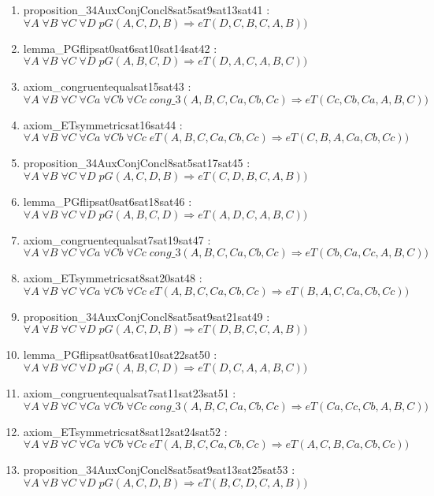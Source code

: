 \documentclass{article}
\begin{document}
\begin{enumerate}
\item proposition\_34AuxConjConcl8sat5sat9sat13sat41 : $\forall A\;\forall B\;\forall C\;\forall D\;pG(A, C, D, B) \Rightarrow eT(D, C, B, C, A, B))$
\item lemma\_PGflipsat0sat6sat10sat14sat42 : $\forall A\;\forall B\;\forall C\;\forall D\;pG(A, B, C, D) \Rightarrow eT(D, A, C, A, B, C))$
\item axiom\_congruentequalsat15sat43 : $\forall A\;\forall B\;\forall C\;\forall Ca\;\forall Cb\;\forall Cc\;cong\_3(A, B, C, Ca, Cb, Cc) \Rightarrow eT(Cc, Cb, Ca, A, B, C))$
\item axiom\_ETsymmetricsat16sat44 : $\forall A\;\forall B\;\forall C\;\forall Ca\;\forall Cb\;\forall Cc\;eT(A, B, C, Ca, Cb, Cc) \Rightarrow eT(C, B, A, Ca, Cb, Cc))$
\item proposition\_34AuxConjConcl8sat5sat17sat45 : $\forall A\;\forall B\;\forall C\;\forall D\;pG(A, C, D, B) \Rightarrow eT(C, D, B, C, A, B))$
\item lemma\_PGflipsat0sat6sat18sat46 : $\forall A\;\forall B\;\forall C\;\forall D\;pG(A, B, C, D) \Rightarrow eT(A, D, C, A, B, C))$
\item axiom\_congruentequalsat7sat19sat47 : $\forall A\;\forall B\;\forall C\;\forall Ca\;\forall Cb\;\forall Cc\;cong\_3(A, B, C, Ca, Cb, Cc) \Rightarrow eT(Cb, Ca, Cc, A, B, C))$
\item axiom\_ETsymmetricsat8sat20sat48 : $\forall A\;\forall B\;\forall C\;\forall Ca\;\forall Cb\;\forall Cc\;eT(A, B, C, Ca, Cb, Cc) \Rightarrow eT(B, A, C, Ca, Cb, Cc))$
\item proposition\_34AuxConjConcl8sat5sat9sat21sat49 : $\forall A\;\forall B\;\forall C\;\forall D\;pG(A, C, D, B) \Rightarrow eT(D, B, C, C, A, B))$
\item lemma\_PGflipsat0sat6sat10sat22sat50 : $\forall A\;\forall B\;\forall C\;\forall D\;pG(A, B, C, D) \Rightarrow eT(D, C, A, A, B, C))$
\item axiom\_congruentequalsat7sat11sat23sat51 : $\forall A\;\forall B\;\forall C\;\forall Ca\;\forall Cb\;\forall Cc\;cong\_3(A, B, C, Ca, Cb, Cc) \Rightarrow eT(Ca, Cc, Cb, A, B, C))$
\item axiom\_ETsymmetricsat8sat12sat24sat52 : $\forall A\;\forall B\;\forall C\;\forall Ca\;\forall Cb\;\forall Cc\;eT(A, B, C, Ca, Cb, Cc) \Rightarrow eT(A, C, B, Ca, Cb, Cc))$
\item proposition\_34AuxConjConcl8sat5sat9sat13sat25sat53 : $\forall A\;\forall B\;\forall C\;\forall D\;pG(A, C, D, B) \Rightarrow eT(B, C, D, C, A, B))$

\end{enumerate}
\end{document}
